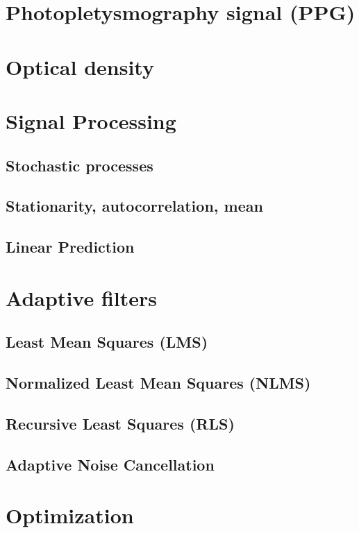 \documentclass{report}
\begin{document}
\section{Photopletysmography signal (PPG)}

\section{Optical density}

\section{Signal Processing}
\subsection{Stochastic processes}
\subsection{Stationarity, autocorrelation, mean}
\subsection{Linear Prediction}

\section{Adaptive filters}

\subsection{Least Mean Squares (LMS)}

\subsection{Normalized Least Mean Squares (NLMS)}

\subsection{Recursive Least Squares (RLS)}

\subsection{Adaptive Noise Cancellation}



\section{Optimization}
\end{document}
